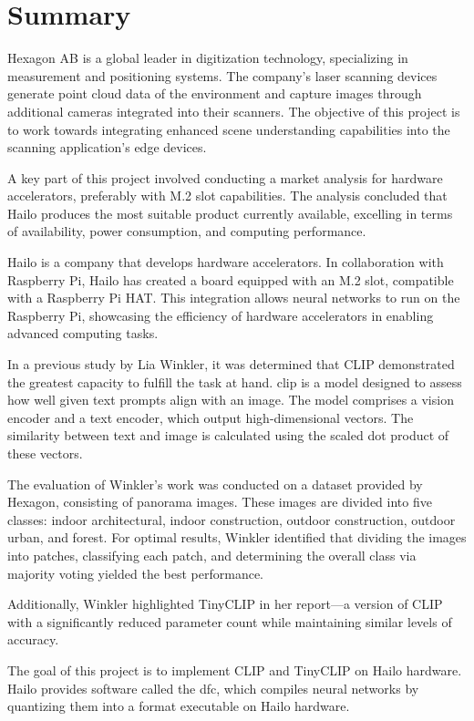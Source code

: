 \chapter*{Summary}
Hexagon AB is a global leader in digitization technology, specializing in measurement and positioning systems.  
The company's laser scanning devices generate point cloud data of the environment and capture images through additional cameras integrated into their scanners.  
The objective of this project is to work towards integrating enhanced scene understanding capabilities into the scanning application's edge devices.

A key part of this project involved conducting a market analysis for hardware accelerators, preferably with M.2 slot capabilities.  
The analysis concluded that Hailo produces the most suitable product currently available, excelling in terms of availability, power consumption, and computing performance.

Hailo is a company that develops hardware accelerators.  
In collaboration with Raspberry Pi, Hailo has created a board equipped with an M.2 slot, compatible with a Raspberry Pi HAT.  
This integration allows neural networks to run on the Raspberry Pi, showcasing the efficiency of hardware accelerators in enabling advanced computing tasks.\hfill\break

In a previous study by Lia Winkler, it was determined that CLIP demonstrated the greatest capacity to fulfill the task at hand.  
\acrfull{clip} is a model designed to assess how well given text prompts align with an image.  
The model comprises a vision encoder and a text encoder, which output high-dimensional vectors.  
The similarity between text and image is calculated using the scaled dot product of these vectors.  

The evaluation of Winkler's work was conducted on a dataset provided by Hexagon, consisting of panorama images.  
These images are divided into five classes: indoor architectural, indoor construction, outdoor construction, outdoor urban, and forest.  
For optimal results, Winkler identified that dividing the images into patches, classifying each patch, and determining the overall class via majority voting yielded the best performance.  

Additionally, Winkler highlighted TinyCLIP in her report—a version of CLIP with a significantly reduced parameter count while maintaining similar levels of accuracy. \hfill\break

The goal of this project is to implement CLIP and TinyCLIP on Hailo hardware.  
Hailo provides software called the \acrfull{dfc}, which compiles neural networks by quantizing them into a format executable on Hailo hardware.  

